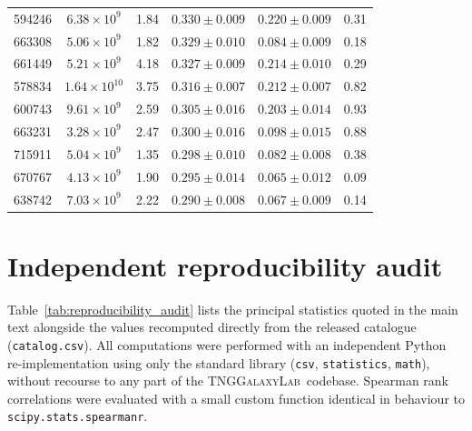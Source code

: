 \documentclass[fleqn,usenatbib]{mnras}
\newcommand{\pipeline}{\textsc{TNGGalaxyLab}}
\begin{document}
\begin{table}
\begin{tabular}{rccccc}
    594246  &  $6.38\!\times\!10^{9}$  &  1.84  &  $0.330 \pm 0.009$  &  $0.220 \pm 0.009$  &  0.31  \\
    663308  &  $5.06\!\times\!10^{9}$  &  1.82  &  $0.329 \pm 0.010$  &  $0.084 \pm 0.009$  &  0.18  \\
    661449  &  $5.21\!\times\!10^{9}$  &  4.18  &  $0.327 \pm 0.009$  &  $0.214 \pm 0.010$  &  0.29  \\
    578834  &  $1.64\!\times\!10^{10}$  &  3.75  &  $0.316 \pm 0.007$  &  $0.212 \pm 0.007$  &  0.82  \\
    600743  &  $9.61\!\times\!10^{9}$  &  2.59  &  $0.305 \pm 0.016$  &  $0.203 \pm 0.014$  &  0.93  \\
    663231  &  $3.28\!\times\!10^{9}$  &  2.47  &  $0.300 \pm 0.016$  &  $0.098 \pm 0.015$  &  0.88  \\
    715911  &  $5.04\!\times\!10^{9}$  &  1.35  &  $0.298 \pm 0.010$  &  $0.082 \pm 0.008$  &  0.38  \\
    670767  &  $4.13\!\times\!10^{9}$  &  1.90  &  $0.295 \pm 0.014$  &  $0.065 \pm 0.012$  &  0.09  \\
    638742  &  $7.03\!\times\!10^{9}$  &  2.22  &  $0.290 \pm 0.008$  &  $0.067 \pm 0.009$  &  0.14  \\
    \bottomrule
  \end{tabular}
\end{table}


\section{Independent reproducibility audit}
\label{app:reproducibility_audit}

Table~\ref{tab:reproducibility_audit} lists the principal statistics
quoted in the main text alongside the values recomputed directly
from the released catalogue (\texttt{catalog.csv}).  All
computations were performed with an independent Python
re-implementation using only the standard library
(\texttt{csv}, \texttt{statistics}, \texttt{math}), without
recourse to any part of the \pipeline\ codebase.  Spearman
rank correlations were evaluated with a small custom function
identical in behaviour to \texttt{scipy.stats.spearmanr}.
\end{document}
